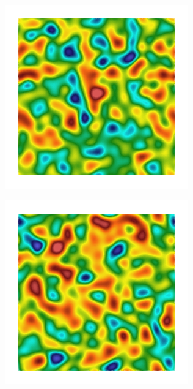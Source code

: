 \begin{figure}[!htb]
    \begin{subfigure}[b]{0.15\textwidth}
        \includegraphics[width=\textwidth]{past/figures/Gc_sqexp_cartesian_5_5_rho_0_seed_a.png}
    \end{subfigure}
    \begin{subfigure}[b]{0.15\textwidth}
        \includegraphics[width=\textwidth]{past/figures/psic_sqexp_cartesian_5_5_rho_0_seed_a.png}

\end{subfigure}
\end{figure}
